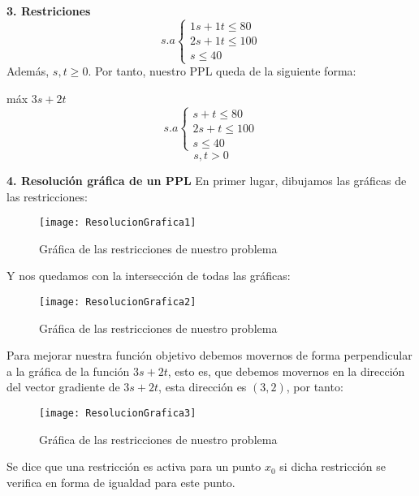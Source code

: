 \documentclass[11pt,fleqn]{book} %
\begin{document}
\textbf{3. Restriciones}
$$s.a\left\lbrace
\begin{array}{l}
1s+1t \leq 80 \\
2s+1t \leq 100 \\
s \leq 40
\end{array}
\right.
$$
Además, $s, t \geq 0$.
Por tanto, nuestro PPL queda de la siguiente forma:
\begin{center}
	máx $3s+2t$
	$$s.a\left\lbrace
	\begin{array}{l}
	s+t \leq 80 \\
	2s+t \leq 100 \\
	s \leq 40
	\end{array}
	\right.
	$$
	$$s, t>0$$
\end{center}
\newpage
\textbf{4. Resolución gráfica de un PPL}
En primer lugar, dibujamos las gráficas de las restricciones:

\begin{figure}[h]
	\centering
	\texttt{[image: ResolucionGrafica1]}
	\caption[Gráfica de las restricciones de nuestro problema]{Gráfica de las restricciones de nuestro problema}
\end{figure}
Y nos quedamos con la intersección de todas las gráficas:
\begin{figure}[h]
	\centering
	\texttt{[image: ResolucionGrafica2]}
	\caption[Gráfica de las restricciones de nuestro problema]{Gráfica de las restricciones de nuestro problema}
\end{figure}
Para mejorar nuestra función objetivo debemos movernos de forma perpendicular a la gráfica de la función $3s+2t$, esto es, que debemos movernos en la dirección del vector gradiente de $3s+2t$, esta dirección es $(3, 2)$, por tanto:
\begin{figure}[!ht]
	\centering
	\texttt{[image: ResolucionGrafica3]}
	\caption[Gráfica de las restricciones de nuestro problema]{Gráfica de las restricciones de nuestro problema}
\end{figure}
\begin{definition}
	Se dice que una restricción es activa para un punto $x_0$ si dicha restricción se verifica en forma de igualdad para este punto.
\end{definition}
\end{document}
